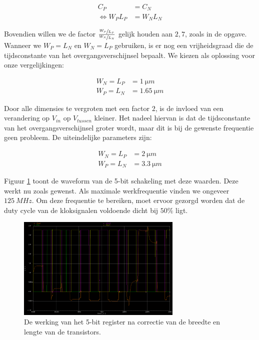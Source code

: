 \documentclass[11pt,a4paper,oneside,dutch]{article}
\begin{document}
\begin{align*}
C_P &= C_N \\
\Leftrightarrow W_P L_P &= W_N L_N
\end{align*}

Bovendien willen we de factor $\frac{\sfrac{W_P}{L_P}}{\sfrac{W_N}{L_N}}$ gelijk houden aan $2,7$, zoals in de opgave. Wanneer we $W_P = L_N$ en $W_N = L_P$ gebruiken, is er nog een vrijheidsgraad die de tijdsconstante van het overgangsverschijnsel bepaalt. We kiezen als oplossing voor onze vergelijkingen:

\begin{align*}
W_N = L_P &= \SI{1}{\micro m} \\
W_P = L_N &= \SI{1,65}{\micro m}
\end{align*}

Door alle dimensies te vergroten met een factor $2$, is de invloed van een verandering op $V_{in}$ op $V_{tussen}$ kleiner. Het nadeel hiervan is dat de tijdsconstante van het overgangsverschijnsel groter wordt, maar dit is bij de gewenste frequentie geen probleem. De uiteindelijke parameters zijn:

\begin{align*}
W_N = L_P &= \SI{2}{\micro m} \\
W_P = L_N &= \SI{3,3}{\micro m}
\end{align*}

Figuur \ref{fig:wave_optimaal} toont de waveform van de 5-bit schakeling met deze waarden. Deze werkt nu zoals gewenst. Als maximale werkfrequentie vinden we ongeveer $\SI{125}{MHz}$. Om deze frequentie te bereiken, moet ervoor gezorgd worden dat de duty cycle van de kloksignalen voldoende dicht bij $50\%$ ligt.

\begin{figure}[htp]
	\centering
	\includegraphics[width=0.7\textwidth]{wave_optimaal.png}
	\caption{De werking van het 5-bit register na correctie van de breedte en lengte van de transistors.}
	\label{fig:wave_optimaal}
\end{figure}
\end{document}
